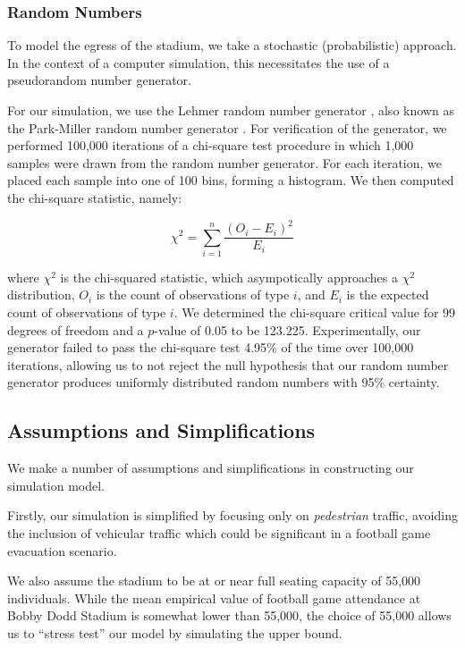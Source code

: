 \documentclass[12pt]{article}
\begin{document}
\subsubsection{Random Numbers}
To model the egress of the stadium, we take a stochastic (probabilistic)
approach. In the context of a computer simulation, this necessitates the use of
a pseudorandom number generator.

For our simulation, we use the Lehmer random number generator
\cite{payne1969coding}, also known as the Park-Miller random number generator
\cite{park1988random}. For verification of the generator, we performed
100,000 iterations of a chi-square test procedure in which 1,000 samples were
drawn from the random number generator. For each iteration, we placed each
sample into one of 100 bins, forming a histogram. We then computed the
chi-square statistic, namely:

\begin{equation}
{\chi}^2=\sum_{i=1}^{n} \frac{(O_i - E_i)^2}{E_i}
\end{equation}

where ${\chi}^2$ is the chi-squared statistic, which asympotically approaches
a ${\chi}^2$ distribution, $O_i$ is the count of observations of type $i$,
and $E_i$ is the expected count of observations of type $i$. We determined the
chi-square critical value for 99 degrees of freedom and a $p$-value of 0.05 to be
123.225. Experimentally, our generator failed to pass the chi-square test 4.95\%
of the time over 100,000 iterations, allowing us to not reject the null
hypothesis that our random number generator produces uniformly distributed
random numbers with 95\% certainty.

\subsection{Assumptions and Simplifications}
We make a number of assumptions and simplifications in constructing our
simulation model.

Firstly, our simulation is simplified by focusing only on
\textit{pedestrian} traffic, avoiding the inclusion of vehicular traffic which
could be significant in a football game evacuation scenario.

We also assume the stadium to be at or near full seating capacity of 55,000
individuals. While the mean empirical value of football game attendance at
Bobby Dodd Stadium is somewhat lower than 55,000, the choice
of 55,000 allows us to ``stress test'' our model by simulating the upper bound.
\end{document}
